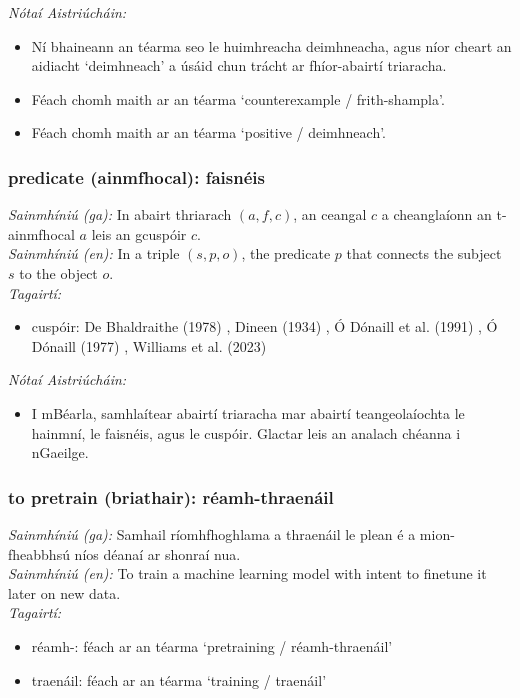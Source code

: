  \noindent \textit{Nótaí Aistriúcháin:}
\begin{itemize}
	\item Ní bhaineann an téarma seo le huimhreacha deimhneacha, agus níor cheart an aidiacht `deimhneach' a úsáid chun trácht ar fhíor-abairtí triaracha.
	\item Féach chomh maith ar an téarma `counterexample / frith-shampla'.
	\item Féach chomh maith ar an téarma `positive / deimhneach'.
\end{itemize}


\subsubsection*{predicate (ainmfhocal): faisnéis}
 \noindent \textit{Sainmhíniú (ga):} In abairt thriarach $(a,f,c)$, an ceangal $c$ a cheanglaíonn an t-ainmfhocal $a$ leis an gcuspóir $c$.
\\
 \noindent \textit{Sainmhíniú (en):} In a triple $(s,p,o)$, the predicate $p$ that connects the subject $s$ to the object $o$.
\\
 \noindent \textit{Tagairtí:}
\begin{itemize}
	\item cuspóir: De Bhaldraithe (1978) \cite{de-bhaldraithe}, Dineen (1934) \cite{dineen}, Ó Dónaill et al. (1991) \cite{focloir-beag}, Ó Dónaill (1977) \cite{odonaill}, Williams et al. (2023) \cite{storchiste}
\end{itemize}

 \noindent \textit{Nótaí Aistriúcháin:}
\begin{itemize}
	\item I mBéarla, samhlaítear abairtí triaracha mar abairtí teangeolaíochta le hainmní, le faisnéis, agus le cuspóir. Glactar leis an analach chéanna i nGaeilge.
\end{itemize}


\subsubsection*{to pretrain (briathair): réamh-thraenáil}
 \noindent \textit{Sainmhíniú (ga):} Samhail ríomhfhoghlama a thraenáil le plean é a mion-fheabbhsú níos déanaí ar shonraí nua.
\\
 \noindent \textit{Sainmhíniú (en):} To train a machine learning model with intent to finetune it later on new data.
\\
 \noindent \textit{Tagairtí:}
\begin{itemize}
	\item réamh-: féach ar an téarma `pretraining / réamh-thraenáil'
	\item traenáil: féach ar an téarma `training / traenáil'
\end{itemize}

